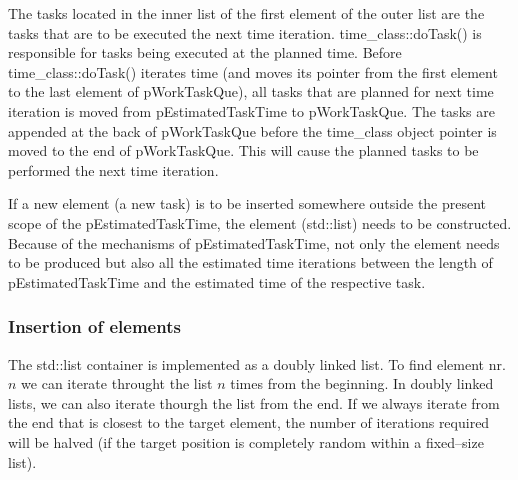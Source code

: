 	The tasks located in the inner list of the first element of the outer list are the tasks that are to be executed the next time iteration.
	time\_class::doTask() is responsible for tasks being executed at the planned time. 
	Before time\_class::doTask() iterates time (and moves its pointer from the first element to the last element of pWorkTaskQue), all tasks that are planned for next time iteration is moved from pEstimatedTaskTime to pWorkTaskQue.
	The tasks are appended at the back of pWorkTaskQue before the time\_class object pointer is moved to the end of pWorkTaskQue. 
	This will cause the planned tasks to be performed the next time iteration.


	If a new element (a new task) is to be inserted somewhere outside the present scope of the pEstimatedTaskTime, the element (std::list) needs to be constructed.
	Because of the mechanisms of pEstimatedTaskTime, not only the element needs to be produced but also all the estimated time iterations between the length of pEstimatedTaskTime and the estimated time of the respective task.

	
	\subsubsection{Insertion of elements}
	The std::list container is implemented as a doubly linked list\cite{Stroustrup2000KAP16}.
	To find element nr. $n$ we can iterate throught the list $n$ times from the beginning.
	In doubly linked lists, we can also iterate thourgh the list from the end.
	If we always iterate from the end that is closest to the target element, the number of iterations required will be halved (if the target position is completely random within a fixed--size list).

